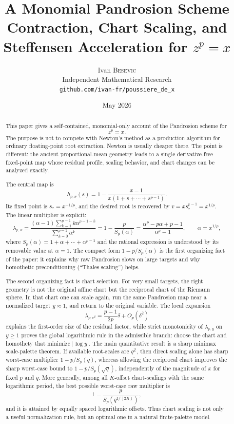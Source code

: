 \documentclass[10pt,a4paper]{article}
\title{\bfseries A Monomial Pandrosion Scheme\\[-0.1em]
\large Contraction, Chart Scaling, and Steffensen Acceleration for $z^p=x$}
\author{Ivan \textsc{Besevic}\\[-0.2em]
\small Independent Mathematical Research\\[-0.2em]
\small \texttt{github.com/ivan-fr/poussiere\_de\_x}}
\date{May 2026}
\theoremstyle{plain}
\theoremstyle{definition}
\theoremstyle{remark}
\begin{document}
\maketitle

\begin{abstract}
This paper gives a self-contained, monomial-only account of the Pandrosion
scheme for
\[
  z^p=x.
\]
The purpose is not to compete with Newton's method as a production algorithm
for ordinary floating-point root extraction.  Newton is usually cheaper there.
The point is different: the ancient proportional-mean geometry leads to a
single derivative-free fixed-point map whose residual profile, scaling behavior,
and chart changes can be analyzed exactly.

The central map is
\[
  h_{p,x}(s)=1-\frac{x-1}{x(1+s+\cdots+s^{p-1})}.
\]
Its fixed point is $s_*=x^{-1/p}$, and the desired root is recovered by
$v=x s_*^{p-1}=x^{1/p}$.  The linear multiplier is explicit:
\[
  \lambda_{p,x}
  =\frac{(\alpha-1)\sum_{k=1}^{p-1}k\alpha^{p-1-k}}
         {\sum_{k=0}^{p-1}\alpha^k}
  =1-\frac{p}{S_p(\alpha)}
  =\frac{\alpha^p-p\alpha+p-1}{\alpha^p-1},
  \qquad \alpha=x^{1/p},
\]
where $S_p(\alpha)=1+\alpha+\cdots+\alpha^{p-1}$ and the rational expression is
understood by its removable value at $\alpha=1$.  The compact form
$1-p/S_p(\alpha)$ is the first organizing fact of the paper: it explains why
raw Pandrosion slows on large targets and why homothetic preconditioning
(``Thales scaling'') helps.

The second organizing fact is chart selection.  For very small targets, the
right geometry is not the original affine chart but the reciprocal chart of the
Riemann sphere.  In that chart one can scale again, run the same Pandrosion map
near a normalized target $y\approx1$, and return to the original variable.  The
local expansion
\[
  \lambda_{p,e^\delta}=\frac{p-1}{2p}\delta+O_p(\delta^2)
\]
explains the first-order size of the residual factor, while strict monotonicity
of $\lambda_{p,y}$ on $y\ge1$ proves the global logarithmic rule in the
admissible branch: choose the chart and homothety that minimize $|\log y|$.
The main quantitative result is a sharp minimax scale-palette theorem.  If
available root-scales are $q^{\mathbb Z}$, then direct scaling alone has sharp
worst-case multiplier $1-p/S_p(q)$, whereas allowing the reciprocal chart
improves the sharp worst-case bound to $1-p/S_p(\sqrt q)$, independently of
the magnitude of $x$ for fixed $p$ and $q$.  More generally, among all
$K$-offset chart-scalings with the same logarithmic period, the best possible
worst-case raw multiplier is
\[
  1-\frac{p}{S_p(q^{1/(2K)})},
\]
and it is attained by equally spaced logarithmic offsets.  Thus chart scaling is
not only a useful normalization rule, but an optimal one in a natural finite-palette
model.


\end{abstract}
\end{document}
